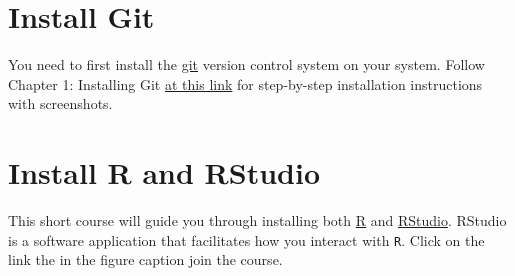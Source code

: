 \documentclass[letterpaper,9pt,twocolumn,twoside,printwatermark=false]{pinp}
\begin{document}
\begin{Shaded}
\end{Shaded}

\section{Install Git}\label{install-git}

You need to first install the \href{https://git-scm.com/}{git} version
control system on your system. Follow Chapter 1: Installing Git
\href{https://plot.ly/r/github-getting-started-for-data-scientists/\#chapter-1-installing-git}{at
this link} for step-by-step installation instructions with screenshots.

\section{Install R and RStudio}\label{install-r-and-rstudio}

This short course will guide you through installing both
\href{https://cran.r-project.org/}{R} and
\href{https://www.rstudio.com/products/rstudio/download/preview/}{RStudio}.
RStudio is a software application that facilitates how you interact with
\texttt{R}. Click on the link the in the figure caption join the course.
\end{document}
